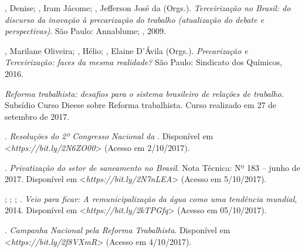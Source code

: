 \begin{Parskip}
, Denise; , Iram Jácome; ,
Jefferson José da (Orgs.). \emph{Terceirização no Brasil: do discurso da
inovação à precarização do trabalho (atualização do debate e perspectivas)}.
São Paulo: Annablume; , 2009.

, Marilane Oliveira; , Hélio;
, Elaine D'Ávila (Orgs.).
\emph{Precarização e Terceirização: faces da mesma realidade?} São
Paulo: Sindicato dos Químicos, 2016.

\emph{Reforma trabalhista: desafios para o sistema brasileiro de relações de
trabalho}. Subsídio Curso Dieese sobre Reforma trabalhista. Curso
realizado em 27 de setembro de 2017.

. \emph{Resoluções do 2º Congresso Nacional da }.
Disponível em \textless{}\emph{https://bit.ly/2N6ZO00}\textgreater{}
(Acesso em 2/10/2017).

. \emph{Privatização do setor de saneamento no Brasil}. Nota Técnica:
Nº 183 -- junho de 2017. Disponível em 
\textless{}\emph{https://bit.ly/2N7nLEA}\textgreater{}
(Acesso em 5/10/2017).

 ;   ; ;
  . \emph{Veio para ficar: A
  remunicipalização da água como uma tendência mundial}, 2014. Disponível em
\textless{}\emph{https://bit.ly/2kTPGfq}\textgreater{}
(Acesso em 05/10/2017).

 . \emph{Campanha Nacional pela Reforma Trabalhista}. Disponível em
\textless{}\emph{https://bit.ly/2f8VXmR}\textgreater{}
(Acesso em 4/10/2017).
\end{Parskip}